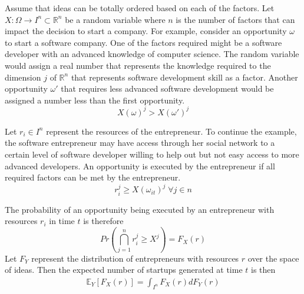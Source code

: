 \documentclass[12pt]{article}
\begin{document}
Assume that ideas can be totally ordered based on each of the factors. Let $X:\Omega\to I^n \subset \mathbb{R}^n$ be a random variable where $n$ is the number of factors that can impact the decision to start a company. For example, consider an opportunity $\omega$ to start a software company. One of the factors required might be a software developer with an advanced knowledge of computer science. The random variable would assign a real number that represents the knowledge required to the dimension $j$ of $\mathbb{R}^n$ that represents software development skill as a factor. Another opportunity $\omega'$ that requires less advanced software development would be assigned a number less than the first opportunity. 
$$X(\omega)^j > X(\omega')^j $$

Let $r_i \in I^n$ represent the resources of the entrepreneur. To continue the example, the software entrepreneur may have access through her social network to a certain level of software developer willing to help out but not easy access to more advanced developers. An opportunity is executed by the entrepreneur if all required factors can be met by the entrepreneur. 
$$r_i^j \ge X(\omega_{it})^j \; \forall j \in n$$

\begin{comment}
We call an idea \textit{unbounded} for an individual if the idea can be executed and \textit{single bounded} on dimension $k$ if
$$\alpha_i^k = X(\omega{it})^k \wedge  \alpha_i^j > X(\omega{it})^j \; \forall j \ne k \in n$$
\end{comment}

The probability of an opportunity being executed by an entrepreneur with resources $r_i$ in time $t$ is therefore 
$$Pr\left(\bigcap _{j=1}^n  r_i^j \ge X^j\right) = F_X(r)$$
Let $F_Y$ represent the distribution of entrepreneurs with resources $r$ over the space of ideas. Then the expected number of startups generated at time $t$ is then 
\begin{align}
\mathbb{E}_{Y}[F_X(r)]=\int_{I^n} F_X(r) dF_Y(r)
\end{align}
\end{document}
